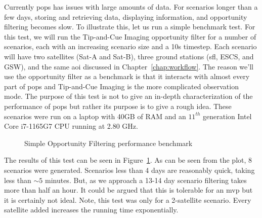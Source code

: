 Currently \gls{pops} has issues with large amounts of data. For scenarios
longer than a few days, storing and retrieving data, displaying information,
and opportunity filtering becomes slow. To illustrate this, let us run a simple
benchmark test. For this test, we will run the Tip-and-Cue Imaging opportunity
filter for a number of scenarios, each with an increasing scenario size and a
10s timestep. Each scenario will have two satellites (Sat-A and Sat-B), three
ground stations (\acrshort{sfl}, ESCS, and GSW), and the same \gls{aoi}
discussed in Chapter~\ref{chap:workflow}. The reason we'll use the opportunity
filter as a benchmark is that it interacts with almost every part of \gls{pops}
and Tip-and-Cue Imaging is the more complicated observation mode.
The purpose of this test is not to give an in-depth characterization of the
performance of \gls{pops} but rather its purpose is to give a rough idea.
These scenarios were run on a laptop with 40GB of RAM and an $11^{th}$
generation Intel Core i7-1165G7 CPU running at 2.80 GHz. 


\begin{figure}[h]
    \centering
    \caption{Simple Opportunity Filtering performance benchmark}
    \label{fig:performance-benchmark}
\end{figure}

The results of this test can be seen in Figure~\ref{fig:performance-benchmark}.
As can be seen from the plot, 8 scenarios were generated. Scenarios less than 4
days are reasonably quick, taking less than $\sim5$ minutes. But, as we
approach a 13-14 day scenario filtering takes more than half an hour. It could
be argued that this is tolerable for an \gls{mvp} but it is certainly not
ideal.  Note, this test was only for a 2-satellite scenario. Every satellite
added increases the running time exponentially. 

